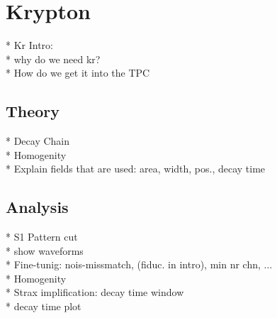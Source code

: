 
\section{Krypton}
\label{sec:Kr}

* Kr Intro: \\
* why do we need kr? \\
* How do we get it into the TPC

\subsection{Theory}

* Decay Chain \\
* Homogenity \\
* Explain fields that are used: area, width, pos., decay time

\subsection{Analysis}

* S1 Pattern cut \\
* show waveforms \\
* Fine-tunig: nois-missmatch, (fiduc. in intro), min nr chn, ... \\
* Homogenity \\
* Strax implification: decay time window \\
* decay time plot


